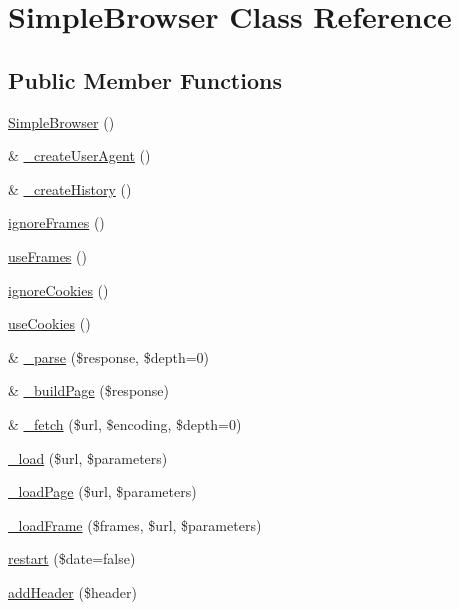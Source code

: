 \hypertarget{class_simple_browser}{
\section{SimpleBrowser Class Reference}
\label{class_simple_browser}
}
\subsection*{Public Member Functions}
\begin{DoxyCompactItemize}
\item 
\hyperlink{class_simple_browser_a91c688a632c8e9378d82bc9cad80ed2a}{SimpleBrowser} ()
\item 
\& \hyperlink{class_simple_browser_ac9098377a41772b9eafd3b2d2b3fdbea}{\_\-createUserAgent} ()
\item 
\& \hyperlink{class_simple_browser_abaaba39a9acb33bbbe29a9fcc2461da4}{\_\-createHistory} ()
\item 
\hyperlink{class_simple_browser_aa2c35905e26fa5d489c9a9d7640080ee}{ignoreFrames} ()
\item 
\hyperlink{class_simple_browser_ab27fafcc008f75fb25256282c1c9871e}{useFrames} ()
\item 
\hyperlink{class_simple_browser_a116178a0d8efe15140f1fdfd53cd8d3c}{ignoreCookies} ()
\item 
\hyperlink{class_simple_browser_ae56fff4a6243ee4b0e938a3ef1a31bf8}{useCookies} ()
\item 
\& \hyperlink{class_simple_browser_aaa3c3ddf5ec5c06f50a5cd91ce5fe75d}{\_\-parse} (\$response, \$depth=0)
\item 
\& \hyperlink{class_simple_browser_ab669833829037f7d13fc1d5ec0d6399b}{\_\-buildPage} (\$response)
\item 
\& \hyperlink{class_simple_browser_a20a8f7856e67fc79d9ff320d618b8c1f}{\_\-fetch} (\$url, \$encoding, \$depth=0)
\item 
\hyperlink{class_simple_browser_abcf8e196a5097f77f5db62c3c8a3266a}{\_\-load} (\$url, \$parameters)
\item 
\hyperlink{class_simple_browser_ac342b81f23bffe9adeab560679ab5bac}{\_\-loadPage} (\$url, \$parameters)
\item 
\hyperlink{class_simple_browser_a4bda5280c9c6babbf5d0424e82f80fd4}{\_\-loadFrame} (\$frames, \$url, \$parameters)
\item 
\hyperlink{class_simple_browser_af390891e306e3ddcd2ac5ebc3df5a287}{restart} (\$date=false)
\item 
\hyperlink{class_simple_browser_aa9cc6dc208dc7a3aa3a68dcaf3466063}{addHeader} (\$header)

\end{DoxyCompactItemize}
